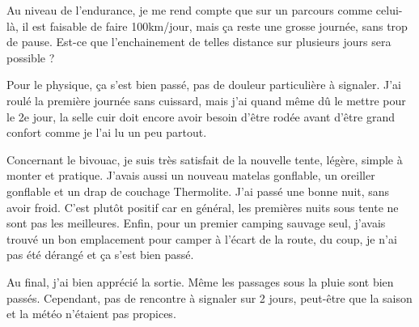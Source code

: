  Au niveau de l'endurance, je me rend compte que sur un parcours comme celui-là, il est faisable de faire 100km/jour, mais ça reste une grosse journée, sans trop de pause. Est-ce que l'enchainement de telles distance sur plusieurs jours sera possible ?

 Pour le physique, ça s'est bien passé, pas de douleur particulière à signaler. J'ai roulé la première journée sans cuissard, mais j'ai quand même dû le mettre pour le 2e jour, la selle cuir doit encore avoir besoin d'être rodée avant d'être grand confort comme je l'ai lu un peu partout.

 Concernant le bivouac, je suis très satisfait de la nouvelle tente, légère, simple à monter et pratique. J'avais aussi un nouveau matelas gonflable, un oreiller gonflable et un drap de couchage Thermolite. J'ai passé une bonne nuit, sans avoir froid. C'est plutôt positif car en général, les premières nuits sous tente ne sont pas les meilleures. Enfin, pour un premier camping sauvage seul, j'avais trouvé un bon emplacement pour camper à l'écart de la route, du coup, je n'ai pas été dérangé et ça s'est bien passé.

 Au final, j'ai bien apprécié la sortie. Même les passages sous la pluie sont bien passés. Cependant, pas de rencontre à signaler sur 2 jours, peut-être que la saison et la météo n'étaient pas propices. 
